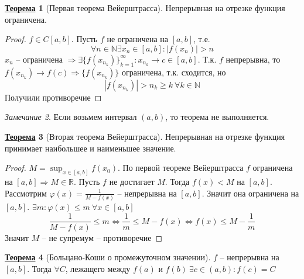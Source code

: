 \documentclass[12pt]{article}
\def\N{\mathbb{N}}       %
\def\R{\mathbb{R}}       %
\def\SO{\Rightarrow}     %
\def\EQ{\Leftrightarrow} %
\theoremstyle{definition} %
\newtheorem{Thm}{\underline{Теорема}}[subsection] %
\theoremstyle{plain} %
\theoremstyle{remark} %
\newtheorem{Rem}[Thm]{Замечание} %
\begin{document}
\begin{Thm}[Первая теорема Вейерштрасса]
    Непрерывная на отрезке функция ограничена.
\end{Thm}

\begin{proof}
    $f \in C[a, b]$. Пусть $f$ не ограничена на $[a, b]$, т.е.
    \[\forall n \in \N \exists x_n \in [a, b] : |f(x_n)| > n\]  
    $x_n$ -- ограничена $\SO \exists \{f(x_{n_k})\}_{k = 1}^\infty : x_{n_k} \to c \in [a, b]$. Т.к. $f$ непрерывна, то $f(x_{n_k}) \to f(c) \SO \{f(x_{n_k})\}$ ограничена, т.к. сходится, но
    \[|f(x_{n_k})| > n_k \geqslant k \ \forall k \in \N\]   
    Получили противоречие
\end{proof}

\begin{Rem}
    Если возьмем интервал $(a, b)$, то теорема не выполняется. 
\end{Rem}

\begin{Thm}[Вторая теорема Вейерштрасса]
    Непрерывная на отрезке функция принимает наибольшее и наименьшее значение.
\end{Thm}

\begin{proof}
    $M = \sup_{x \in [a, b]} f(x_0)$. По первой теореме Вейерштрасса $f$ ограничена на $[a, b] \SO M \in \R$. Пусть $f$ не достигает $M$. Тогда $f(x) < M$ на $[a, b]$. 
    Рассмотрим $\varphi(x) = \frac{1}{M - f(x)}$ -- непрерывна на $[a, b]$. Значит она ограничена на $[a, b]$. $\exists m : \varphi(x) \leqslant m \ \forall x \in [a, b]$
    \[\frac{1}{M - f(x)} \leqslant m \EQ \frac{1}{m} \leqslant M - f(x) \EQ f(x) \leqslant M - \frac{1}{m}\]
    Значит $M$ -- не супремум -- противоречие       
\end{proof}

\begin{Thm}[Больцано-Коши о промежуточном значении]
    $f$ -- непрерывна на $[a, b]$. Тогда $\forall C$, лежащего между $f(a)$ и $f(b) \ \exists c \in (a, b) : f(c) = C$   
\end{Thm}
\end{document}
